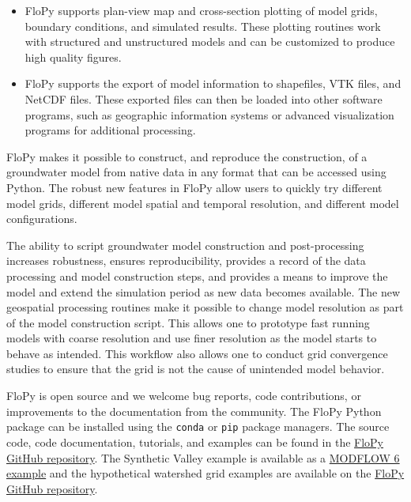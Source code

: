 \documentclass[12pt, oneside]{article}  	%
\begin{document}
\begin{itemize}
\item FloPy supports plan-view map and cross-section plotting of model grids, boundary conditions, and simulated results. These plotting routines work with structured and unstructured models and can be customized to produce high quality figures.

\item FloPy supports the export of model information to shapefiles, VTK files, and NetCDF files. These exported files can then be loaded into other software programs, such as geographic information systems or advanced visualization programs for additional processing.

\end{itemize}

FloPy makes it possible to construct, and reproduce the construction, of a groundwater model from native data in any format that can be accessed using Python. The robust new features in FloPy allow users to quickly try different model grids, different model spatial and temporal resolution, and different model configurations. 

The ability to script groundwater model construction and post-processing increases robustness, ensures reproducibility, provides a record of the data processing and model construction steps, and provides a means to improve the model and extend the simulation period as new data becomes available. The new geospatial processing routines make it possible to change model resolution as part of the model construction script. This allows one to prototype fast running models with coarse resolution and use finer resolution as the model starts to behave as intended. This workflow also allows one to conduct grid convergence studies to ensure that the grid is not the cause of unintended model behavior.

FloPy is open source and we welcome bug reports, code contributions, or improvements to the documentation from the community. The FloPy Python package can be installed using the \texttt{conda} or \texttt{pip} package managers. The source code, code documentation, tutorials, and examples can be found in the \href{https://github.com/modflowpy/flopy}{FloPy GitHub repository}. The Synthetic Valley example is available as a \href{https://modflow6-examples.readthedocs.io/en/master/examples.html}{MODFLOW 6 example} and the hypothetical watershed grid examples are available on the \href{https://github.com/modflowpy/flopy/tree/develop/examples/mf6_groundwater_paper}{FloPy GitHub repository}.
\end{document}
